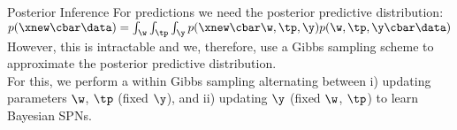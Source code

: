 \begin{frame}{Posterior Inference}
  For predictions we need the posterior predictive distribution: $p(\xnew \cbar \data) = \int_{\w} \int_{\tp} \int_{\y} p(\xnew \cbar \w, \tp, \y) p(\w, \tp, \y \cbar \data)$ \\[1em]
  
 However, this is intractable and we, therefore, use a Gibbs sampling scheme to approximate the posterior predictive distribution.\\[1em]
 
 For this, we perform a within Gibbs sampling alternating between i) updating parameters $\w$, $\tp$ (fixed $\y$), and ii) updating $\y$ (fixed $\w$, $\tp$) to learn Bayesian SPNs.
\end{frame}


%
%
%
%
%
%
%
%
%
%
%
